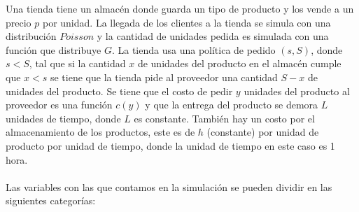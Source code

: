\documentclass{article}
\begin{document}
Una tienda tiene un almacén donde guarda un tipo de producto y los vende a un precio $p$ por unidad.
La llegada de los clientes a la tienda se simula con una distribución $Poisson$ y la cantidad de unidades pedida es simulada con una función que distribuye $G$.
La tienda usa una política de pedido $(s,S)$, donde $s<S$, tal que si la cantidad $x$ de unidades del producto en el almacén cumple que $x<s$ se tiene que la tienda pide al
proveedor una cantidad $S-x$ de unidades del producto. Se tiene que el costo de pedir $y$ unidades del producto al proveedor es una función $c(y)$ y que la entrega
del producto se demora $L$ unidades de tiempo, donde $L$ es constante. También hay un costo por el almacenamiento de los productos, este es de $h$ (constante) por unidad de producto por unidad de tiempo, donde la unidad de tiempo en este caso es 1 hora.
\\\\
Las variables con las que contamos en la simulación se pueden dividir en las siguientes categorías:
\end{document}
